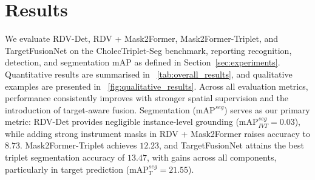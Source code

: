 \documentclass[pdflatex,sn-mathphys-num]{sn-jnl}%
\newcommand{\mAP}{\textrm{mAP}}
\newcommand{\figref}[1]{\figurename~\ref{#1}}
\newcommand{\tabref}[1]{\tablename~\ref{#1}}
\newcommand{\secref}[1]{Section~\ref{#1}}
\theoremstyle{thmstyleone}%
\theoremstyle{thmstyletwo}%
\theoremstyle{thmstylethree}%
\begin{document}
\section{Results}
\label{sec:results}
We evaluate RDV-Det, RDV + Mask2Former, Mask2Former-Triplet, and TargetFusionNet on the CholecTriplet-Seg benchmark, reporting recognition, detection, and segmentation $\mAP$ as defined in \secref{sec:experiments}.  
Quantitative results are summarised in \tabref{tab:overall_results}, and qualitative examples are presented in \figref{fig:qualitative_results}. Across all evaluation metrics, performance consistently improves with stronger spatial supervision and the introduction of target-aware fusion.  
Segmentation ($\mAP^{seg}$) serves as our primary metric: RDV-Det provides negligible instance-level grounding ($\mAP_{IVT}^{seg}=0.03$), while adding strong instrument masks in RDV + Mask2Former raises accuracy to $8.73$.  
Mask2Former-Triplet achieves $12.23$, and TargetFusionNet attains the best triplet segmentation accuracy of $13.47$, with gains across all components, particularly in target prediction ($\mAP_{T}^{seg}=21.55$). 
\end{document}
